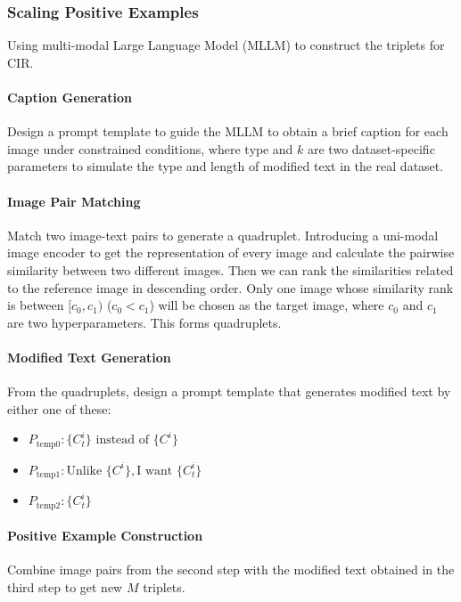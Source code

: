 \subsubsection{Scaling Positive Examples}
Using multi-modal Large Language Model (MLLM) to construct the triplets for CIR.

\paragraph{Caption Generation}
Design a prompt template to guide the MLLM to obtain a brief caption for each image under constrained conditions, where \(\text{type}\) and \(k\) are two dataset-specific parameters to simulate the type and length of modified text in the real dataset.

\paragraph{Image Pair Matching}
Match two image-text pairs to generate a quadruplet. Introducing a uni-modal image encoder to get the representation of every image and calculate the pairwise similarity between two different images. Then we can rank the similarities related to the reference image in descending order. Only one image whose similarity rank is between \([c_0, c_1)\) (\(c_0 < c_1\)) will be chosen as the target image, where \(c_0\) and \(c_1\) are two hyperparameters. This forms quadruplets.

\paragraph{Modified Text Generation}
From the quadruplets, design a prompt template that generates modified text by either one of these:
\begin{itemize}
    \item \(P_{\text{temp0}}: \{C_t^i\} \text{ instead of } \{C^i\}\)
    \item \(P_{\text{temp1}}: \text{Unlike } \{C^i\}, \text{I want } \{C_t^i\}\)
    \item \(P_{\text{temp2}}: \{C_t^i\}\)
\end{itemize}

\paragraph{Positive Example Construction}
Combine image pairs from the second step with the modified text obtained in the third step to get new \(M\) triplets.

